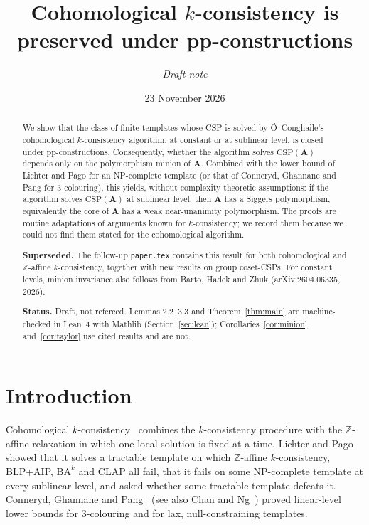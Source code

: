 \documentclass[11pt]{article}
\title{Cohomological $k$-consistency is preserved under pp-constructions}
\author{\emph{Draft note}}
\date{23 November 2026}
\theoremstyle{definition}
\theoremstyle{remark}
\newcommand{\Csp}{\mathrm{CSP}}
\begin{document}
\maketitle

\begin{abstract}
We show that the class of finite templates whose CSP is solved by
\'O~Conghaile's cohomological $k$-consistency algorithm, at constant or at
sublinear level, is closed under pp-constructions. Consequently, whether the
algorithm solves $\Csp(\mathbf A)$ depends only on the polymorphism minion of
$\mathbf A$. Combined with the lower bound of Lichter and Pago for an
NP-complete template (or that of Conneryd, Ghannane and Pang for
3-colouring), this yields, without complexity-theoretic assumptions: if the
algorithm solves $\Csp(\mathbf A)$ at sublinear level, then $\mathbf A$ has a
Siggers polymorphism, equivalently the core of $\mathbf A$ has a weak
near-unanimity polymorphism. The proofs are routine adaptations of arguments
known for $k$-consistency; we record them because we could not find them
stated for the cohomological algorithm.

\smallskip\noindent\textbf{Superseded.} The follow-up \texttt{paper.tex} contains this
result for both cohomological and $\mathbb Z$-affine $k$-consistency, together with new
results on group coset-CSPs. For constant levels, minion invariance also follows from
Barto, Hadek and Zhuk (arXiv:2604.06335, 2026).

\smallskip\noindent\textbf{Status.} Draft, not refereed. Lemmas 2.2--3.3 and
Theorem~\ref{thm:main} are machine-checked in Lean~4 with Mathlib
(Section~\ref{sec:lean}); Corollaries~\ref{cor:minion} and~\ref{cor:taylor}
use cited results and are not.
\end{abstract}

\section{Introduction}

Cohomological $k$-consistency~\cite{OC22} combines the $k$-consistency
procedure with the $\mathbb Z$-affine relaxation in which one local solution
is fixed at a time. Lichter and Pago~\cite{LP25} showed that it solves a
tractable template on which $\mathbb Z$-affine $k$-consistency, BLP+AIP,
$\mathrm{BA}^k$ and CLAP all fail, that it fails on some NP-complete template
at every sublinear level, and asked whether some tractable template defeats
it. Conneryd, Ghannane and Pang~\cite{CGP26} (see also Chan and
Ng~\cite{CN25}) proved linear-level lower bounds for 3-colouring and for lax,
null-constraining templates.
\end{document}
